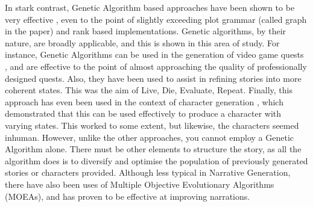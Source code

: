\documentclass[11pt]{article}
\begin{document}
In stark contrast, Genetic Algorithm based approaches have been shown to be very effective \cite{mcintyre-lapata-2010-plot}, even to the point of slightly exceeding plot grammar (called graph in the paper) and rank based implementations. Genetic algorithms, by their nature, are broadly applicable, and this is shown in this area of study. For instance, Genetic Algorithms can be used in the generation of video game quests \cite{questgeneration}, and are effective to the point of almost approaching the quality of professionally designed quests. Also, they have been used to assist in refining stories into more coherent states. This was the aim of Live, Die, Evaluate, Repeat\cite{Riegl2018LiveDE}. Finally, this approach has even been used in the context of character generation \cite{charactergeneration}, which demonstrated that this can be used effectively to produce a character with varying states. This worked to some extent, but likewise, the characters seemed inhuman. However, unlike the other approaches, you cannot employ a Genetic Algorithm alone. There must be other elements to structure the story, as all the algorithm does is to diversify and optimise the population of previously generated stories or characters provided. Although less typical in Narrative Generation, there have also been uses of Multiple Objective Evolutionary Algorithms (MOEAs)\cite{MOEANarrative}, and has proven to be effective at improving narrations.\\
\end{document}
